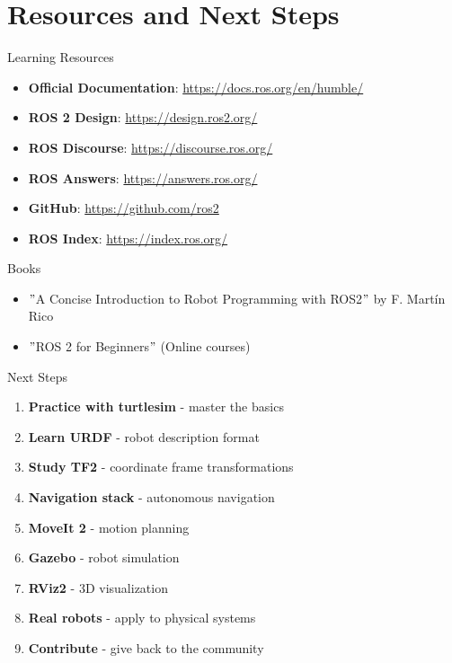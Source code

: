 \section{Resources and Next Steps}

\begin{frame}{Learning Resources}
    \begin{itemize}
        \item \textbf{Official Documentation}: \url{https://docs.ros.org/en/humble/}
        \item \textbf{ROS 2 Design}: \url{https://design.ros2.org/}
        \item \textbf{ROS Discourse}: \url{https://discourse.ros.org/}
        \item \textbf{ROS Answers}: \url{https://answers.ros.org/}
        \item \textbf{GitHub}: \url{https://github.com/ros2}
        \item \textbf{ROS Index}: \url{https://index.ros.org/}
    \end{itemize}

    \begin{block}{Books}
        \begin{itemize}
            \item $"$A Concise Introduction to Robot Programming with ROS2$"$ by F. Martín Rico
            \item $"$ROS 2 for Beginners$"$ (Online courses)
        \end{itemize}
    \end{block}
\end{frame}

\begin{frame}{Next Steps}
    \begin{enumerate}
        \item \textbf{Practice with turtlesim} - master the basics
        \item \textbf{Learn URDF} - robot description format
        \item \textbf{Study TF2} - coordinate frame transformations
        \item \textbf{Navigation stack} - autonomous navigation
        \item \textbf{MoveIt 2} - motion planning
        \item \textbf{Gazebo} - robot simulation
        \item \textbf{RViz2} - 3D visualization
        \item \textbf{Real robots} - apply to physical systems
        \item \textbf{Contribute} - give back to the community
    \end{enumerate}
\end{frame}

